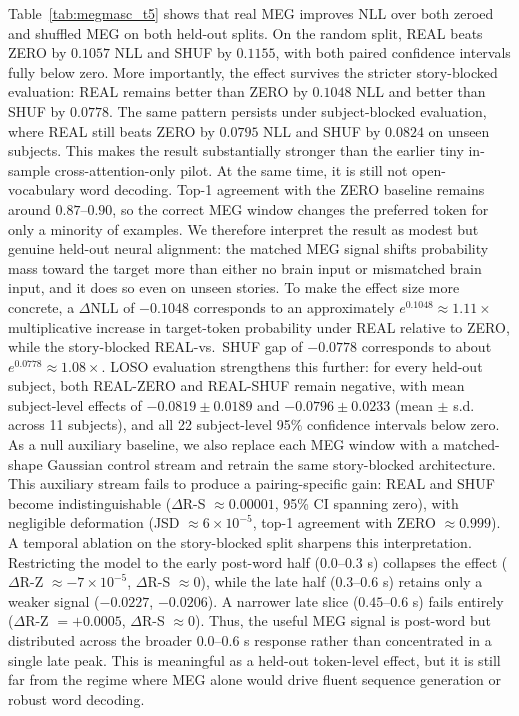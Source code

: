 \documentclass{article}
\theoremstyle{plain}
\theoremstyle{definition}
\theoremstyle{remark}
\begin{document}
Table~\ref{tab:megmasc_t5} shows that real MEG improves NLL over both zeroed and shuffled MEG on both held-out splits.
On the random split, REAL beats ZERO by $0.1057$ NLL and SHUF by $0.1155$, with both paired confidence intervals fully below zero.
More importantly, the effect survives the stricter story-blocked evaluation: REAL remains better than ZERO by $0.1048$ NLL and better than SHUF by $0.0778$.
The same pattern persists under subject-blocked evaluation, where REAL still beats ZERO by $0.0795$ NLL and SHUF by $0.0824$ on unseen subjects.
This makes the result substantially stronger than the earlier tiny in-sample cross-attention-only pilot.
At the same time, it is still not open-vocabulary word decoding.
Top-1 agreement with the ZERO baseline remains around $0.87$--$0.90$, so the correct MEG window changes the preferred token for only a minority of examples.
We therefore interpret the result as modest but genuine held-out neural alignment: the matched MEG signal shifts probability mass toward the target more than either no brain input or mismatched brain input, and it does so even on unseen stories.
To make the effect size more concrete, a $\Delta$NLL of $-0.1048$ corresponds to an approximately $e^{0.1048}\!\approx\!1.11\times$ multiplicative increase in target-token probability under REAL relative to ZERO, while the story-blocked REAL-vs.\ SHUF gap of $-0.0778$ corresponds to about $e^{0.0778}\!\approx\!1.08\times$.
LOSO evaluation strengthens this further: for every held-out subject, both REAL-ZERO and REAL-SHUF remain negative, with mean subject-level effects of $-0.0819 \pm 0.0189$ and $-0.0796 \pm 0.0233$ (mean $\pm$ s.d. across 11 subjects), and all 22 subject-level 95\% confidence intervals below zero.
As a null auxiliary baseline, we also replace each MEG window with a matched-shape Gaussian control stream and retrain the same story-blocked architecture.
This auxiliary stream fails to produce a pairing-specific gain: REAL and SHUF become indistinguishable ($\Delta$R-S $\approx 0.00001$, 95\% CI spanning zero), with negligible deformation (JSD $\approx 6\times10^{-5}$, top-1 agreement with ZERO $\approx 0.999$).
A temporal ablation on the story-blocked split sharpens this interpretation.
Restricting the model to the early post-word half ($0.0$--$0.3$ s) collapses the effect ($\Delta$R-Z $\approx -7\times10^{-5}$, $\Delta$R-S $\approx 0$), while the late half ($0.3$--$0.6$ s) retains only a weaker signal ($-0.0227$, $-0.0206$).
A narrower late slice ($0.45$--$0.6$ s) fails entirely ($\Delta$R-Z $= +0.0005$, $\Delta$R-S $\approx 0$).
Thus, the useful MEG signal is post-word but distributed across the broader $0.0$--$0.6$ s response rather than concentrated in a single late peak.
This is meaningful as a held-out token-level effect, but it is still far from the regime where MEG alone would drive fluent sequence generation or robust word decoding.
\end{document}
